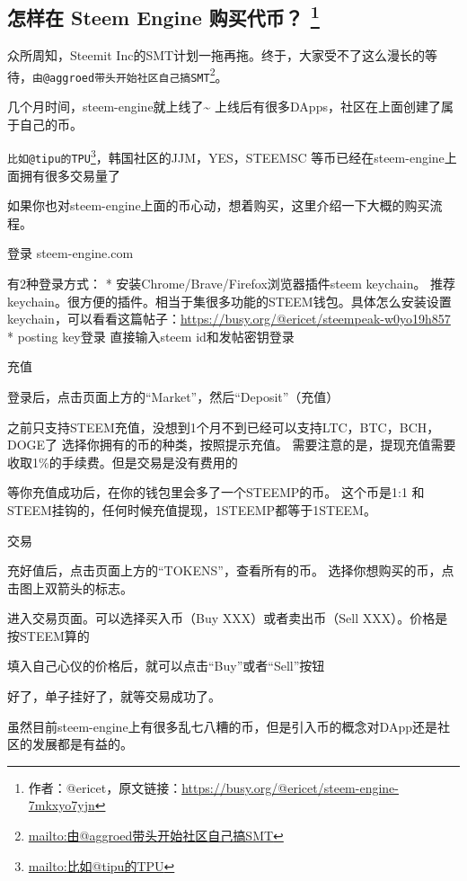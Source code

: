 \documentclass[]{ctexbook}
\renewcommand{\href}[2]{#2\footnote{\url{#1}}}
\begin{document}
\hypertarget{purchase-token}{%
\subsection[怎样在 Steem Engine 购买代币？ ]{\texorpdfstring{怎样在 Steem Engine 购买代币？ \footnote{作者：@ericet，原文链接：\url{https://busy.org/@ericet/steem-engine-7mkxyo7yjn}}}{怎样在 Steem Engine 购买代币？ }}\label{purchase-token}}

众所周知，Steemit Inc的SMT计划一拖再拖。终于，大家受不了这么漫长的等待，\href{mailto:由@aggroed带头开始社区自己搞SMT}{\nolinkurl{由@aggroed带头开始社区自己搞SMT}}。

几个月时间，steem-engine就上线了\textasciitilde{} 上线后有很多DApps，社区在上面创建了属于自己的币。

\href{mailto:比如@tipu的TPU}{\nolinkurl{比如@tipu的TPU}}，韩国社区的JJM，YES，STEEMSC 等币已经在steem-engine上面拥有很多交易量了

如果你也对steem-engine上面的币心动，想着购买，这里介绍一下大概的购买流程。

登录 steem-engine.com

有2种登录方式：
* 安装Chrome/Brave/Firefox浏览器插件steem keychain。
推荐keychain。很方便的插件。相当于集很多功能的STEEM钱包。具体怎么安装设置keychain，可以看看这篇帖子：\url{https://busy.org/@ericet/steempeak-w0yo19h857}
* posting key登录
直接输入steem id和发帖密钥登录

充值

登录后，点击页面上方的``Market''，然后``Deposit''（充值）

之前只支持STEEM充值，没想到1个月不到已经可以支持LTC，BTC，BCH，DOGE了
选择你拥有的币的种类，按照提示充值。
需要注意的是，提现充值需要收取1\%的手续费。但是交易是没有费用的

等你充值成功后，在你的钱包里会多了一个STEEMP的币。
这个币是1:1 和STEEM挂钩的，任何时候充值提现，1STEEMP都等于1STEEM。

交易

充好值后，点击页面上方的``TOKENS''，查看所有的币。
选择你想购买的币，点击图上双箭头的标志。

进入交易页面。可以选择买入币（Buy XXX）或者卖出币（Sell XXX）。价格是按STEEM算的

填入自己心仪的价格后，就可以点击``Buy''或者``Sell''按钮

好了，单子挂好了，就等交易成功了。

虽然目前steem-engine上有很多乱七八糟的币，但是引入币的概念对DApp还是社区的发展都是有益的。
\end{document}
